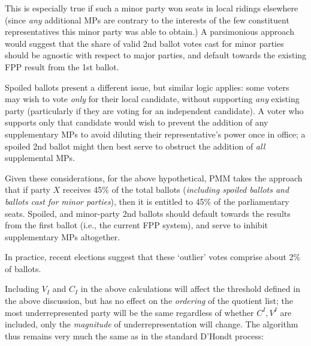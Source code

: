 \documentclass[DIV=calc, paper=a4, fontsize=11pt, twocolumn]{scrartcl}	 %
\begin{document}
This is especially true if such a minor party won seats in local ridings elsewhere (since \emph{any} additional MPs are contrary to the interests of the few constituent representatives this minor party was able to obtain.) 
A parsimonious approach would suggest that the share of valid 2nd ballot votes cast for minor parties should be agnostic with respect to major parties, and default towards the existing FPP result from the 1st ballot. 

Spoiled ballots present a different issue, but similar logic applies: some voters may wish to vote \emph{only} for their local candidate, without supporting \emph{any} existing party (particularly if they are voting for an independent candidate). A voter who supports only that candidate would wish to prevent the addition of any supplementary MPs to avoid diluting their representative's power once in office; a spoiled 2nd ballot might then best serve to obstruct the addition of \emph{all} supplemental MPs.

Given these considerations, for the above hypothetical, PMM takes the approach that if party $X$ receives 45\% of the total ballots (\emph{including spoiled ballots and ballots cast for minor parties}), then it is entitled to 45\% of the parliamentary seats. 
Spoiled, and minor-party 2nd ballots should default towards the results from the first ballot (i.e., the current FPP system), and serve to inhibit supplementary MPs altogether. 

In practice, recent elections suggest that these `outlier' votes comprise about 2\% of ballots. 

Including $V_I$ and $C_I$ in the above calculations will affect the threshold defined in the above discussion, but has no effect on the \emph{ordering} of the quotient list; the most underrepresented party will be the same regardless of whether $C^I, V^I$ are included, only the \emph{magnitude} of underrepresentation will change. 
The algorithm thus remains very much the same as in the standard D'Hondt process:
\end{document}
